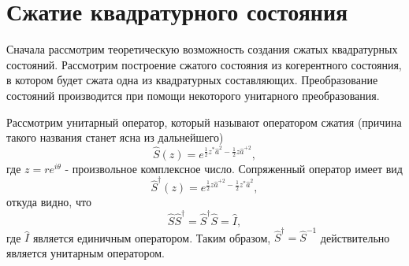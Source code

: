 \section{Сжатие квадратурного состояния}
Сначала рассмотрим теоретическую возможность создания сжатых
квадратурных состояний. Рассмотрим построение сжатого состояния из
когерентного состояния, в котором будет сжата одна из квадратурных
составляющих. Преобразование состояний производится при помощи
некоторого унитарного преобразования.

Рассмотрим унитарный оператор, который называют оператором сжатия
(причина такого названия станет ясна из дальнейшего)
\begin{equation}
\hat{S}\left(z\right) = e^{\frac{1}{2}z^{*}\hat{a}^2 -
\frac{1}{2}z\hat{a}^{+2}},
\nonumber
\end{equation}
где $z = r e^{i\theta}$ - произвольное комплексное число.
Сопряженный оператор имеет вид
\begin{equation}
\hat{S}^{\dag}\left(z\right) = e^{\frac{1}{2}z\hat{a}^{+2} -
\frac{1}{2}z^{*}\hat{a}^{2}}, 
\nonumber
\end{equation}
откуда видно, что
\begin{equation}
\hat{S} \hat{S}^{\dag} = \hat{S}^{\dag} \hat{S} = \hat{I},
\nonumber
\end{equation}
где $\hat{I}$ является единичным оператором. Таким образом, $\hat{S}^{\dag} =
\hat{S}^{-1}$ действительно является унитарным оператором.

